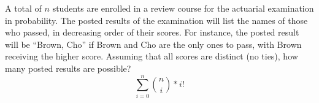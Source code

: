 \item A total of $n$ students are enrolled in a review course for the actuarial examination in probability. The posted results of the examination will list the names of those who passed, in decreasing order of their scores. For instance, the posted result will be \enquote{Brown, Cho} if Brown and Cho are the only ones to pass, with Brown receiving the higher score. Assuming that all scores are distinct (no ties), how many posted results are possible?
\[
\sum_{i=0}^n \binom{n}{i} * i!
\]